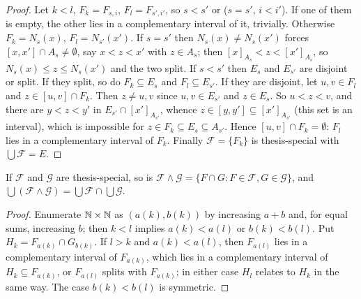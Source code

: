 \begin{proof}
Let $k<l$, $F_k=F_{s,i}$, $F_l=F_{s',i'}$, so $s<s'$ or ($s=s'$, $i<i'$). If one of them is empty, the other lies in a complementary interval
of it, trivially. Otherwise $F_k=N_s(x)$, $F_l=N_{s'}(x')$.
If $s=s'$ then $N_s(x)\ne N_s(x')$ forces $[x,x']\cap A_s\ne\emptyset$, say $x<z<x'$ with $z\in A_s$; then $[x]_{A_s}<z<[x']_{A_s}$, so
$N_s(x)\le z\le N_s(x')$ and the two split. If $s<s'$ then $E_s$ and $E_{s'}$ are disjoint or split. If they split, so do $F_k\subseteq E_s$ and
$F_l\subseteq E_{s'}$. If they are disjoint, let $u,v\in F_l$ and $z\in[u,v]\cap F_k$. Then $z\ne u,v$ since $u,v\in E_{s'}$ and $z\in E_s$.
So $u<z<v$, and there are $y<z<y'$ in $E_{s'}\cap[x']_{A_{s'}}$, whence $z\in[y,y']\subseteq[x']_{A_{s'}}$ (this set is an interval), which is
impossible for $z\in F_k\subseteq E_s\subseteq A_{s'}$. Hence $[u,v]\cap F_k=\emptyset$: $F_l$ lies in a complementary interval of $F_k$.
Finally $\mathcal F=\{F_k\}$ is thesis-special with $\bigcup\mathcal F=E$.
\end{proof}

\begin{lemma}\label{lem:th-lemma11}
If $\mathcal F$ and $\mathcal G$ are thesis-special, so is $\mathcal F\wedge\mathcal G=\{F\cap G:F\in\mathcal F,G\in\mathcal G\}$, and
$\bigcup(\mathcal F\wedge\mathcal G)=\bigcup\mathcal F\cap\bigcup\mathcal G$.
\end{lemma}
\begin{proof}
Enumerate $\mathbb{N}\times\mathbb{N}$ as $(a(k),b(k))$ by increasing $a+b$ and, for equal sums, increasing $b$; then $k<l$ implies $a(k)<a(l)$ or
$b(k)<b(l)$. Put $H_k=F_{a(k)}\cap G_{b(k)}$. If $l>k$ and $a(k)<a(l)$, then $F_{a(l)}$ lies in a complementary interval of $F_{a(k)}$, which
lies in a complementary interval of $H_k\subseteq F_{a(k)}$, or $F_{a(l)}$ splits with $F_{a(k)}$; in either case $H_l$ relates to $H_k$ in the
same way. The case $b(k)<b(l)$ is symmetric.
\end{proof}


